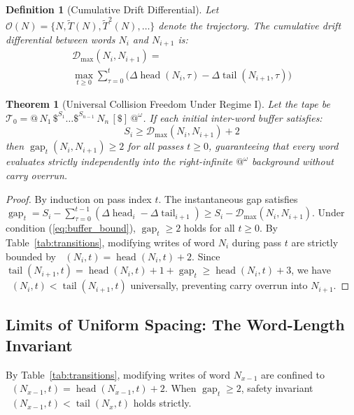 \documentclass[journal,10pt,twocolumn]{IEEEtran}
\newtheorem{theorem}{Theorem}
\newtheorem{definition}{Definition}
\DeclareMathOperator{\tail}{tail}
\DeclareMathOperator{\head}{head}
\DeclareMathOperator{\gap}{gap}
\DeclareMathOperator{\writemax}{write_{\max}}
\begin{document}
\begin{definition}[Cumulative Drift Differential]
Let $\mathcal{O}(N) = \{N, \widetilde{T}(N), \widetilde{T}^2(N), \dots\}$ denote the trajectory. The cumulative drift differential between words $N_i$ and $N_{i+1}$ is:
\begin{multline}
\mathcal{D}_{\max}(N_i, N_{i+1}) = \\
\max_{t \ge 0} \sum_{\tau=0}^t \big( \Delta \head(N_i, \tau) - \Delta \tail(N_{i+1}, \tau) \big)
\label{eq:dmax_def}
\end{multline}
\end{definition}

\begin{theorem}[Universal Collision Freedom Under Regime I]
Let the tape be $\mathcal{T}_0 = @ \, N_1 \, \$^{S_1} \dots \$^{S_{n-1}} \, N_n \, [\$] \, @^\omega$. If each initial inter-word buffer satisfies:
\begin{equation}
S_i \ge \mathcal{D}_{\max}(N_i, N_{i+1}) + 2
\label{eq:buffer_bound}
\end{equation}
then $\gap_t(N_i, N_{i+1}) \ge 2$ for all passes $t \ge 0$, guaranteeing that every word evaluates strictly independently into the right-infinite $@^\omega$ background without carry overrun.
\end{theorem}
\begin{proof}
By induction on pass index $t$. The instantaneous gap satisfies $\gap_t = S_i - \sum_{\tau=0}^{t-1} (\Delta \head_i - \Delta \tail_{i+1}) \ge S_i - \mathcal{D}_{\max}(N_i, N_{i+1})$. Under condition (\ref{eq:buffer_bound}), $\gap_t \ge 2$ holds for all $t \ge 0$. By Table~\ref{tab:transitions}, modifying writes of word $N_i$ during pass $t$ are strictly bounded by $\writemax(N_i, t) = \head(N_i, t) + 2$. Since $\tail(N_{i+1}, t) = \head(N_i, t) + 1 + \gap_t \ge \head(N_i, t) + 3$, we have $\writemax(N_i, t) < \tail(N_{i+1}, t)$ universally, preventing carry overrun into $N_{i+1}$.
\end{proof}

\subsection{Limits of Uniform Spacing: The Word-Length Invariant}
By Table~\ref{tab:transitions}, modifying writes of word $N_{x-1}$ are confined to $\writemax(N_{x-1}, t) = \head(N_{x-1}, t) + 2$.
When $\gap_t \ge 2$, safety invariant $\writemax(N_{x-1}, t) < \tail(N_x, t)$ holds strictly.
\end{document}
